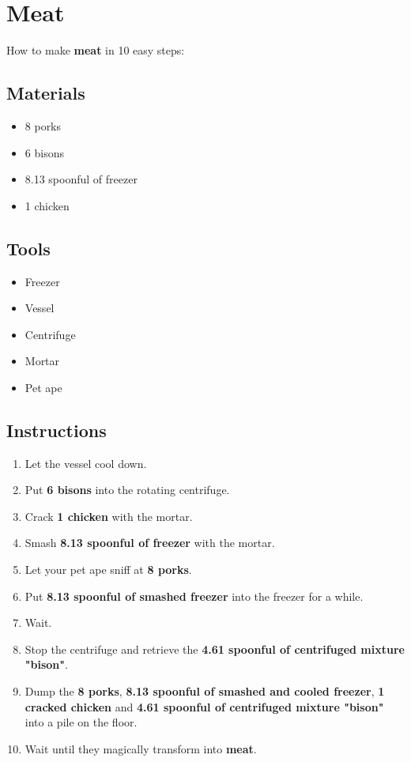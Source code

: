 \documentclass{article}
\begin{document}
\section{Meat}How to make \textbf{meat} in 10 easy steps:

\subsection{Materials}\begin{itemize}
\item 
8 porks
\item 
6 bisons
\item 
8.13 spoonful of freezer
\item 
1 chicken
\end{itemize}
\subsection{Tools}\begin{itemize}
\item 
Freezer
\item 
Vessel
\item 
Centrifuge
\item 
Mortar
\item 
Pet ape
\end{itemize}
\subsection{Instructions}\begin{enumerate}
\item 
Let the vessel cool down.
\item 
Put \textbf{6 bisons} into the rotating centrifuge.
\item 
Crack \textbf{1 chicken} with the mortar.
\item 
Smash \textbf{8.13 spoonful of freezer} with the mortar.
\item 
Let your pet ape sniff at \textbf{8 porks}.
\item 
Put \textbf{8.13 spoonful of smashed freezer} into the freezer for a while.
\item 
Wait.
\item 
Stop the centrifuge and retrieve the \textbf{4.61 spoonful of centrifuged mixture "bison"}.
\item 
Dump the \textbf{8 porks}, \textbf{8.13 spoonful of smashed and cooled freezer}, \textbf{1 cracked chicken} and \textbf{4.61 spoonful of centrifuged mixture "bison"} into a pile on the floor.
\item 
Wait until they magically transform into \textbf{meat}.
\end{enumerate}
\newpage
\end{document}
